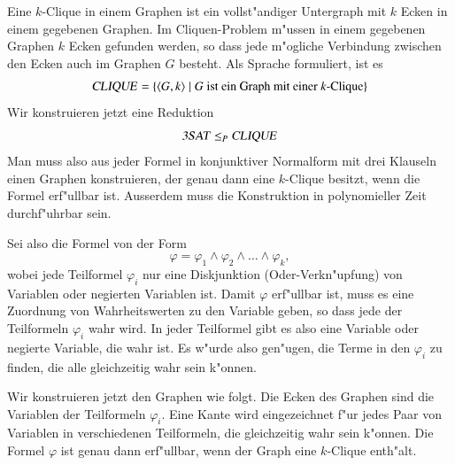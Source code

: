 \begin{beispiel}
Eine $k$-Clique in einem Graphen ist ein vollst"andiger
Untergraph mit $k$ Ecken in einem gegebenen Graphen. Im Cliquen-Problem m"ussen
in einem gegebenen Graphen $k$ Ecken gefunden werden, so dass
jede m"ogliche Verbindung zwischen den Ecken auch im Graphen $G$ 
besteht. Als Sprache formuliert, ist es
\[
\text{\textsl{CLIQUE}}
=\{
\langle G,k\rangle\;|\;\text{$G$ ist ein Graph mit einer $k$-Clique}
\}
\]
Wir konstruieren jetzt eine Reduktion 
\[
\text{\textsl{3SAT}}\le_P
\text{\textsl{CLIQUE}}
\]
Man muss also aus jeder Formel in konjunktiver Normalform mit
drei Klauseln einen Graphen konstruieren, der genau dann eine
$k$-Clique besitzt, wenn die Formel erf"ullbar ist. Ausserdem
muss die Konstruktion in polynomieller Zeit durchf"uhrbar sein.

Sei also die Formel von der Form
\[
\varphi
=
\varphi_1\wedge\varphi_2\wedge\dots\wedge\varphi_k,
\]
wobei jede Teilformel $\varphi_i$ nur eine Diskjunktion (Oder-Verkn"upfung)
von Variablen oder negierten Variablen ist. Damit $\varphi$
erf"ullbar ist, muss es eine Zuordnung von Wahrheitswerten zu
den Variable geben, so dass jede der Teilformeln $\varphi_i$ wahr
wird. In jeder Teilformel gibt es also eine Variable oder 
negierte Variable, die wahr ist. Es w"urde also gen"ugen,
die Terme in den $\varphi_i$ zu finden, die alle gleichzeitig
wahr sein k"onnen.

Wir konstruieren jetzt den Graphen wie folgt. Die Ecken des Graphen
sind die Variablen der Teilformeln $\varphi_i$. Eine Kante wird
eingezeichnet f"ur jedes Paar von Variablen in verschiedenen
Teilformeln, die gleichzeitig wahr sein k"onnen. Die Formel $\varphi$
ist genau dann erf"ullbar, wenn der Graph eine $k$-Clique enth"alt.


\end{beispiel}
